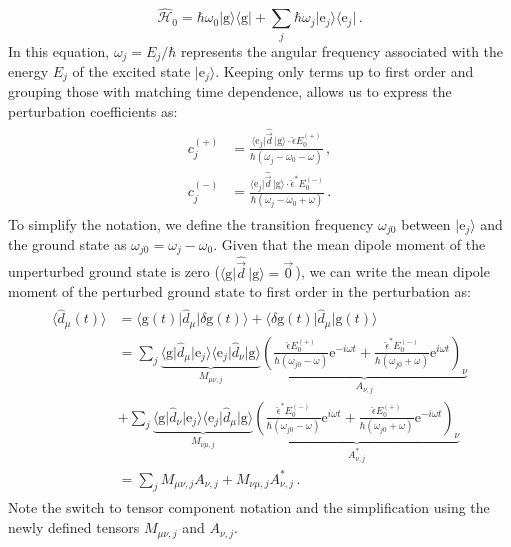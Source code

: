 \documentclass[../Thesis-IJspeert.tex]{subfiles}
\begin{document}
\begin{equation}
	\hat{\mathcal{H}}_0=\hbar\omega_0\vert \mathrm{g} \rangle \langle \mathrm{g} \vert + \sum_j \hbar \omega_j \vert \mathrm{e}_j \rangle \langle \mathrm{e}_j \vert \,.
\end{equation}
In this equation, $\omega_j=E_j/\hbar$ represents the angular frequency associated with the energy $E_j$ of the excited state $\vert \mathrm{e}_j \rangle$. Keeping only terms up to first order and grouping those with matching time dependence, allows us to express the perturbation coefficients as:
\begin{align}
\begin{split}
c_j^{(+)} &= \frac{\langle \mathrm{e}_j \vert \hat{\vec{d}}\, \vert \mathrm{g} \rangle \cdot \hat{\epsilon} E_0^{(+)}}{\hbar(\omega_{j}-\omega_0-\omega)} \,,\\ 
c_j^{(-)} &= \frac{\langle \mathrm{e}_j \vert \hat{\vec{d}}\, \vert \mathrm{g} \rangle \cdot \hat{\epsilon}^* E_0^{(-)}}{\hbar(\omega_{j}-\omega_0+\omega)} \,.
\end{split}
\end{align}
To simplify the notation, we define the transition frequency $\omega_{j0}$ between $\vert \mathrm{e}_j \rangle$ and the ground state as $\omega_{j0}=\omega_j-\omega_0$. Given that the mean dipole moment of the unperturbed ground state is zero ($\langle \mathrm{g} \vert \hat{\vec{d}} \, \vert \mathrm{g} \rangle= \vec{0}\,$), we can write the mean dipole moment of the perturbed ground state to first order in the perturbation as:
\begin{align}
\label{equationdipolemomentexpectationvalue}
\begin{split}
	\langle \hat{d}_\mu (t) \rangle &= \langle \mathrm{g}(t) \vert \hat{d}_\mu \vert \delta \mathrm{g}(t) \rangle + \langle \delta \mathrm{g}(t) \vert \hat{d}_\mu \vert \mathrm{g}(t) \rangle \\ &= \sum_j \underbrace{ \langle \mathrm{g} \vert \hat{{d}}_\mu \vert \mathrm{e}_j \rangle \langle \mathrm{e}_j \vert \hat{{d}}_\nu \vert \mathrm{g} \rangle }_{M_{\mu\nu,j}} \underbrace{ \left( \frac{\hat{\epsilon} E_0^{(+)}}{\hbar(\omega_{j0} - \omega)}\mathrm{e}^{-i\omega t} + \frac{\hat{\epsilon}^* E_0^{(-)}}{\hbar ( \omega_{j0} + \omega)} \mathrm{e}^{i\omega t} \right)_{\!\nu} }_{A_{\nu,j}} \\ &+ \sum_j \underbrace{  \langle \mathrm{g} \vert \hat{{d}}_\nu \vert \mathrm{e}_j \rangle \langle \mathrm{e}_j \vert \hat{{d}}_\mu \vert \mathrm{g} \rangle }_{M_{\nu\mu,j}} \underbrace{ \left( \frac{\hat{\epsilon}^* E_0^{(-)}}{\hbar(\omega_{j0} - \omega)}\mathrm{e}^{i\omega t} + \frac{\hat{\epsilon} E_0^{(+)}}{\hbar ( \omega_{j0} + \omega)} \mathrm{e}^{-i\omega t} \right)_{\!\nu} }_{A^*_{\nu,j}} \\ &= \sum_j M_{\mu\nu,j} A_{\nu,j} + M_{\nu\mu,j} A_{\nu,j}^* \,.
\end{split}
\end{align}
Note the switch to tensor component notation and the simplification using the newly defined tensors $M_{\mu\nu,j}$ and $A_{\nu,j}$.
\end{document}
